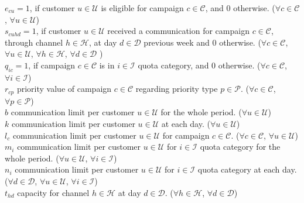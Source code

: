 \documentclass[11pt]{article}
\begin{document}
\noindent $e_{{c}{u}}=1$, if customer $u \in \mathcal{U}$ is eligible for campaign $c \in \mathcal{C}$, and 0 otherwise.
($\forall c \in \mathcal{C}$, $\forall u \in \mathcal{U}$)\\

\noindent $s_{{c}{u}{h}{d}}=1$, if customer $u \in \mathcal{U}$ received a communication for campaign $c \in \mathcal{C}$, through channel $h \in \mathcal{H}$, at day $d \in \mathcal{D}$ previous week and 0 otherwise.
($\forall c \in \mathcal{C}$, $\forall u \in \mathcal{U}$, $\forall h \in \mathcal{H}$, $\forall d \in \mathcal{D}$ )\\

\noindent $q_{{i}{c}}=1$, if campaign $c \in \mathcal{C}$ is in $i \in \mathcal{I}$ quota category, and 0 otherwise.
($\forall c \in \mathcal{C}$, $\forall i \in \mathcal{I}$)\\

\noindent $r_{{c}{p}}$ priority value of campaign $c \in \mathcal{C}$ regarding priority type $p \in \mathcal{P}$.
($\forall c \in \mathcal{C}$, $\forall p \in \mathcal{P}$)\\

\noindent $b$ communication limit per customer $u \in \mathcal{U}$ for the whole period.
($\forall u \in \mathcal{U}$)\\

\noindent $k$ communication limit per customer $u \in \mathcal{U}$ at each day.
($\forall u \in \mathcal{U}$)\\

\noindent $l_{c}$ communication limit per customer $u \in \mathcal{U}$ for campaign $c \in \mathcal{C}$.
($\forall c \in \mathcal{C}$, $\forall u \in \mathcal{U}$)\\

\noindent $m_{i}$ communication limit per customer $u \in \mathcal{U}$ for $i \in \mathcal{I}$ quota category for the whole period.
($\forall u \in \mathcal{U}$, $\forall i \in \mathcal{I}$)\\

\noindent $n_{i}$ communication limit per customer $u \in \mathcal{U}$ for $i \in \mathcal{I}$ quota category at each day.
($\forall d \in \mathcal{D}$, $\forall u \in \mathcal{U}$, $\forall i \in \mathcal{I}$)\\

\noindent $t_{{h}{d}}$ capacity for channel $h \in \mathcal{H}$ at day $d \in \mathcal{D}$.
($\forall h \in \mathcal{H}$, $\forall d \in \mathcal{D}$)\\
\end{document}
